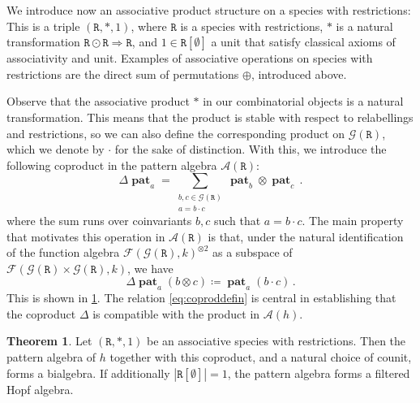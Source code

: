 \documentclass[12pt, reqno]{amsart}
\theoremstyle{definition}
\newtheorem{thm}{Theorem}[section]
\DeclareMathOperator{\pat}{\mathbf{pat}}
\newcommand{\prR}{\mathtt{R}}
\begin{document}


We introduce now an associative product structure on a species with restrictions:
This is a triple $(\prR, \ast, 1)$, where $\prR$ is a species with restrictions, $\ast $ is a natural transformation $\prR\odot \prR \Rightarrow \prR$, and $1 \in \prR[\emptyset ] $ a unit that satisfy classical axioms of associativity and unit. 
Examples of associative operations on species with restrictions are the direct sum of permutations $\oplus$, introduced above.

Observe that the associative product $\ast $ in our combinatorial objects is a natural transformation.
This means that the product is stable with respect to relabellings and restrictions, so we can also define the corresponding product on $\mathcal{G}(\prR)$, which we denote by $\cdot $ for the sake of distinction.
With this, we introduce the following coproduct in the pattern algebra $\mathcal A (\prR)$:
\begin{equation}\label{eq:coprodformula}
\Delta \pat_ a = \sum_{\substack{ b, c\in \mathcal G (\prR) \\ a = b \cdot c}} \pat_b \otimes \pat_c \, .
\end{equation}
where the sum runs over coinvariants $b, c$ such that $a = b \cdot c$.
The main property that motivates this operation in $\mathcal{A}(\prR)$ is that, under the natural identification of the function algebra $\mathcal{F}(\mathcal G (\prR), k)^{\otimes 2} $ as a subspace of $\mathcal{F}(\mathcal G (\prR) \times \mathcal G (\prR), k) $, we have
\begin{equation}\label{eq:coproddefin}
 \Delta \pat_a (b \otimes  c) \coloneqq  \pat_a (b \cdot c) \, .
\end{equation}
This is shown in \cref{thm:conHopfalgebra}.
The relation \eqref{eq:coproddefin} is central in establishing that the coproduct $\Delta $ is compatible with the product in $\mathcal A (h)$.


\begin{thm}\label{thm:conHopfalgebra}
Let $(\prR, \ast, 1) $ be an associative species with restrictions.
Then the pattern algebra of $h$ together with this coproduct, and a natural choice of counit, forms a bialgebra.
If additionally $| \prR[\emptyset ] | = 1 $, the pattern algebra forms a filtered Hopf algebra.
\end{thm}

\end{document}
